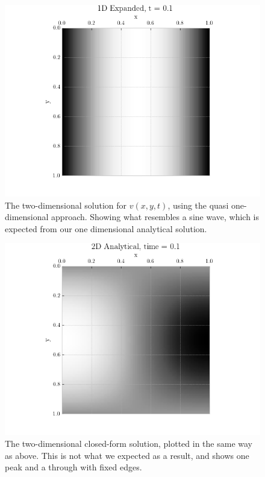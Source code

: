 \documentclass[%
reprint,
nofootinbib,
amsmath,amssymb,
aps,
]{revtex4-1}
\begin{document}
\begin{figure}
	\centering
	\includegraphics[width=0.95\linewidth]{./figures/2D1DExpand.png}
	\caption{The two-dimensional solution for $v(x,y,t)$, using the quasi one-dimensional approach. Showing what resembles a sine wave, which is expected from our one dimensional analytical solution.}
	\label{fig 2d2}
\end{figure}
\begin{figure}
	\centering
	\includegraphics[width=0.95\linewidth]{./figures/2DAna.png}
	\caption{The two-dimensional closed-form solution, plotted in the same way as above. This is not what we expected as a result, and shows one peak and a through with fixed edges. }
	\label{fig 2d3}
\end{figure}
\end{document}
